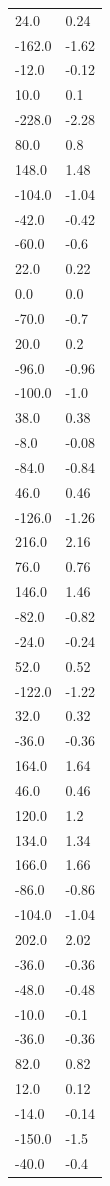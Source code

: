 \begin{longtable}{ll}
24.0 & 0.24 \\
-162.0 & -1.62 \\
-12.0 & -0.12 \\
10.0 & 0.1 \\
-228.0 & -2.28 \\
80.0 & 0.8 \\
148.0 & 1.48 \\
-104.0 & -1.04 \\
-42.0 & -0.42 \\
-60.0 & -0.6 \\
22.0 & 0.22 \\
0.0 & 0.0 \\
-70.0 & -0.7 \\
20.0 & 0.2 \\
-96.0 & -0.96 \\
-100.0 & -1.0 \\
38.0 & 0.38 \\
-8.0 & -0.08 \\
-84.0 & -0.84 \\
46.0 & 0.46 \\
-126.0 & -1.26 \\
216.0 & 2.16 \\
76.0 & 0.76 \\
146.0 & 1.46 \\
-82.0 & -0.82 \\
-24.0 & -0.24 \\
52.0 & 0.52 \\
-122.0 & -1.22 \\
32.0 & 0.32 \\
-36.0 & -0.36 \\
164.0 & 1.64 \\
46.0 & 0.46 \\
120.0 & 1.2 \\
134.0 & 1.34 \\
166.0 & 1.66 \\
-86.0 & -0.86 \\
-104.0 & -1.04 \\
202.0 & 2.02 \\
-36.0 & -0.36 \\
-48.0 & -0.48 \\
-10.0 & -0.1 \\
-36.0 & -0.36 \\
82.0 & 0.82 \\
12.0 & 0.12 \\
-14.0 & -0.14 \\
-150.0 & -1.5 \\
-40.0 & -0.4 \\

\end{longtable}
